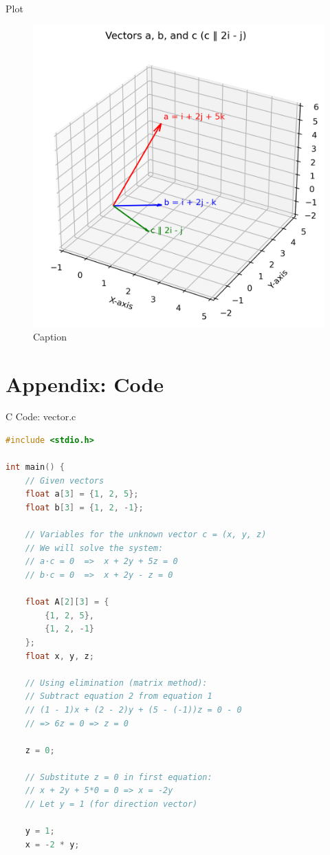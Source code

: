 \documentclass{beamer}
\numberwithin{equation}{section}
\theoremstyle{remark}
\begin{document}
    \begin{frame}{Plot}
        \begin{figure}
            \centering
            \includegraphics[width=0.65\columnwidth]{figs/01.png}
            \caption{Caption}
            \label{fig:placeholder}
        \end{figure}
    \end{frame}

\section*{Appendix: Code}

\begin{frame}[fragile]{C Code: vector.c}
\begin{lstlisting}[language=C]
#include <stdio.h>

int main() {
    // Given vectors
    float a[3] = {1, 2, 5};
    float b[3] = {1, 2, -1};

    // Variables for the unknown vector c = (x, y, z)
    // We will solve the system:
    // a·c = 0  =>  x + 2y + 5z = 0
    // b·c = 0  =>  x + 2y - z = 0

    float A[2][3] = {
        {1, 2, 5},
        {1, 2, -1}
    };
    float x, y, z;

    // Using elimination (matrix method):
    // Subtract equation 2 from equation 1
    // (1 - 1)x + (2 - 2)y + (5 - (-1))z = 0 - 0
    // => 6z = 0 => z = 0

    z = 0;

    // Substitute z = 0 in first equation:
    // x + 2y + 5*0 = 0 => x = -2y
    // Let y = 1 (for direction vector)

    y = 1;
    x = -2 * y;
\end{lstlisting}
\end{frame}
\end{document}
